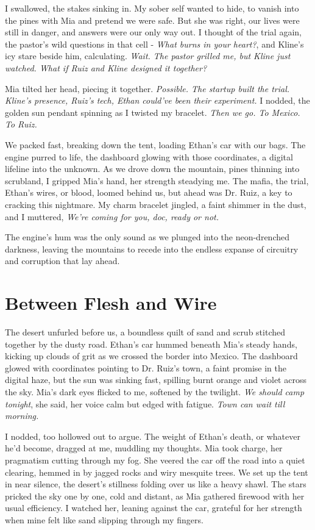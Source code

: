 \documentclass[12pt,oneside]{book} %
\begin{document}
I swallowed, the stakes sinking in. My sober self wanted to hide, to vanish into the pines with Mia and pretend we were safe. But she was right, our lives were still in danger, and answers were our only way out. I thought of the trial again, the pastor’s wild questions in that cell - \textit{What burns in your heart?}, and Kline’s icy stare beside him, calculating. \textit{Wait. The pastor grilled me, but Kline just watched. What if Ruiz and Kline designed it together?}

Mia tilted her head, piecing it together. \textit{Possible. The startup built the trial. Kline’s presence, Ruiz’s tech, Ethan could’ve been their experiment.} I nodded, the golden sun pendant spinning as I twisted my bracelet. \textit{Then we go. To Mexico. To Ruiz.}

We packed fast, breaking down the tent, loading Ethan’s car with our bags. The engine purred to life, the dashboard glowing with those coordinates, a digital lifeline into the unknown. As we drove down the mountain, pines thinning into scrubland, I gripped Mia’s hand, her strength steadying me. The mafia, the trial, Ethan’s wires, or blood, loomed behind us, but ahead was Dr. Ruiz, a key to cracking this nightmare. My charm bracelet jingled, a faint shimmer in the dust, and I muttered, \textit{We’re coming for you, doc, ready or not.}

The engine's hum was the only sound as we plunged into the neon-drenched darkness, leaving the mountains to recede into the endless expanse of circuitry and corruption that lay ahead.

\chapter{Between Flesh and Wire}

The desert unfurled before us, a boundless quilt of sand and scrub stitched together by the dusty road. Ethan's car hummed beneath Mia’s steady hands, kicking up clouds of grit as we crossed the border into Mexico. The dashboard glowed with coordinates pointing to Dr. Ruiz’s town, a faint promise in the digital haze, but the sun was sinking fast, spilling burnt orange and violet across the sky. Mia’s dark eyes flicked to me, softened by the twilight. \textit{We should camp tonight}, she said, her voice calm but edged with fatigue. \textit{Town can wait till morning.}

I nodded, too hollowed out to argue. The weight of Ethan’s death, or whatever he’d become, dragged at me, muddling my thoughts. Mia took charge, her pragmatism cutting through my fog. She veered the car off the road into a quiet clearing, hemmed in by jagged rocks and wiry mesquite trees. We set up the tent in near silence, the desert’s stillness folding over us like a heavy shawl. The stars pricked the sky one by one, cold and distant, as Mia gathered firewood with her usual efficiency. I watched her, leaning against the car, grateful for her strength when mine felt like sand slipping through my fingers.
\end{document}
